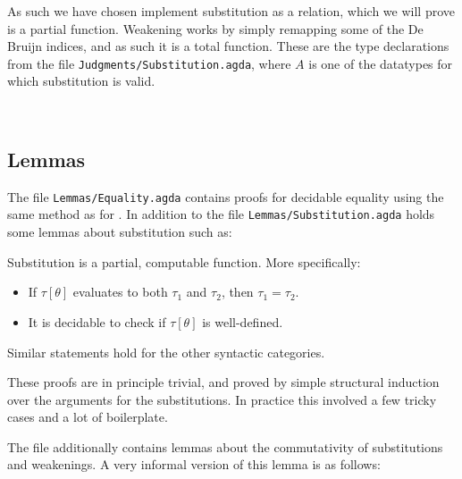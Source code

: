 As such we have chosen implement substitution as a relation, which we will prove
is a partial function. Weakening works by simply remapping some of the De Bruijn
indices, and as such it is a total function. These are the type declarations
from the file \texttt{Judgments/Substitution.agda}, where $A$ is one of the
datatypes for which substitution is valid.

\begin{code}
\>[2]\<[4]%
\>[4] \AgdaSymbol{:}       \<%
\\
\>[2]\<[4]%
\>[4] \AgdaSymbol{:}         \<%
\end{code}

\subsection{Lemmas}

The file \texttt{Lemmas/Equality.agda} contains proofs for decidable equality
using the same method as for \ATALe. In addition to the file
\texttt{Lemmas/Substitution.agda} holds some lemmas about substitution such as:

\begin{lemma}
  \label{lemma:computsubst}
  Substitution is a partial, computable function. More specifically:
  \begin{itemize}
  \item If $\tau[\theta]$ evaluates to both $\tau_1$ and $\tau_2$, then
    $\tau_1 = \tau_2$.
  \item It is decidable to check if $\tau[\theta]$ is well-defined.
  \end{itemize}

  Similar statements hold for the other syntactic categories.
\end{lemma}

These proofs are in principle trivial, and proved by simple structural induction
over the arguments for the substitutions. In practice this involved a few tricky
cases and a lot of boilerplate.

The file additionally contains lemmas about the commutativity of substitutions
and weakenings. A very informal version of this lemma is as follows:

